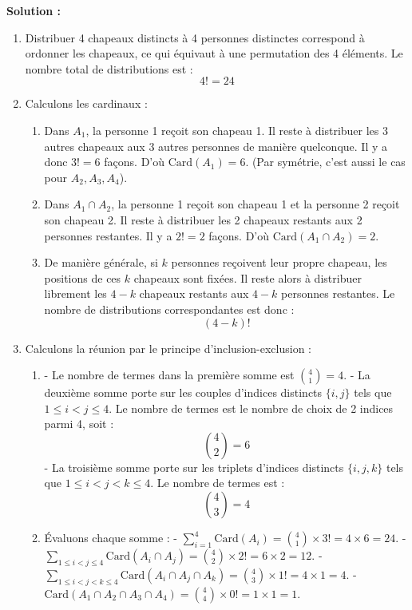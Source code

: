 \textbf{Solution :}
\begin{enumerate}
    \item Distribuer 4 chapeaux distincts à 4 personnes distinctes correspond à ordonner les chapeaux, ce qui équivaut à une permutation des 4 éléments. Le nombre total de distributions est :
    \[
    4! = 24
    \]
    
    \item Calculons les cardinaux :
    \begin{enumerate}
        \item Dans $A_1$, la personne 1 reçoit son chapeau 1. Il reste à distribuer les 3 autres chapeaux aux 3 autres personnes de manière quelconque. Il y a donc $3! = 6$ façons.
        D'où $\text{Card}(A_1) = 6$. (Par symétrie, c'est aussi le cas pour $A_2, A_3, A_4$).
        
        \item Dans $A_1 \cap A_2$, la personne 1 reçoit son chapeau 1 et la personne 2 reçoit son chapeau 2. Il reste à distribuer les 2 chapeaux restants aux 2 personnes restantes.
        Il y a $2! = 2$ façons. D'où $\text{Card}(A_1 \cap A_2) = 2$.
        
        \item De manière générale, si $k$ personnes reçoivent leur propre chapeau, les positions de ces $k$ chapeaux sont fixées. Il reste alors à distribuer librement les $4-k$ chapeaux restants aux $4-k$ personnes restantes.
        Le nombre de distributions correspondantes est donc :
        \[
        (4-k)!
        \]
    \end{enumerate}
    
    \item Calculons la réunion par le principe d'inclusion-exclusion :
    \begin{enumerate}
        \item - Le nombre de termes dans la première somme est $\binom{4}{1} = 4$.
        - La deuxième somme porte sur les couples d'indices distincts $\{i, j\}$ tels que $1 \le i < j \le 4$. Le nombre de termes est le nombre de choix de 2 indices parmi 4, soit :
        \[
        \binom{4}{2} = 6
        \]
        - La troisième somme porte sur les triplets d'indices distincts $\{i, j, k\}$ tels que $1 \le i < j < k \le 4$. Le nombre de termes est :
        \[
        \binom{4}{3} = 4
        \]
        
        \item Évaluons chaque somme :
        - $\sum_{i=1}^4 \text{Card}(A_i) = \binom{4}{1} \times 3! = 4 \times 6 = 24$.
        - $\sum_{1 \le i < j \le 4} \text{Card}(A_i \cap A_j) = \binom{4}{2} \times 2! = 6 \times 2 = 12$.
        - $\sum_{1 \le i < j < k \le 4} \text{Card}(A_i \cap A_j \cap A_k) = \binom{4}{3} \times 1! = 4 \times 1 = 4$.
        - $\text{Card}(A_1 \cap A_2 \cap A_3 \cap A_4) = \binom{4}{4} \times 0! = 1 \times 1 = 1$.
        

\end{enumerate}
\end{enumerate}

